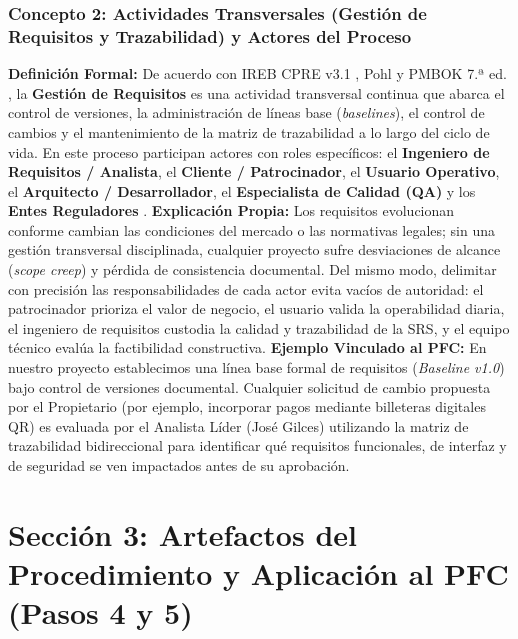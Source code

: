 \documentclass[conference,10pt]{IEEEtran}
\begin{document}
	\subsubsection{Concepto 2: Actividades Transversales (Gestión de Requisitos y Trazabilidad) y Actores del Proceso}
	\textbf{Definición Formal:} De acuerdo con IREB CPRE v3.1 \cite{ireb2023}, Pohl \cite{pohl2025} y PMBOK 7.ª ed. \cite{pmbok}, la \textbf{Gestión de Requisitos} es una actividad transversal continua que abarca el control de versiones, la administración de líneas base (\textit{baselines}), el control de cambios y el mantenimiento de la matriz de trazabilidad a lo largo del ciclo de vida. En este proceso participan actores con roles específicos: el \textbf{Ingeniero de Requisitos / Analista}, el \textbf{Cliente / Patrocinador}, el \textbf{Usuario Operativo}, el \textbf{Arquitecto / Desarrollador}, el \textbf{Especialista de Calidad (QA)} y los \textbf{Entes Reguladores} \cite{ieee29148, wiegers2013}.
	\textbf{Explicación Propia:} Los requisitos evolucionan conforme cambian las condiciones del mercado o las normativas legales; sin una gestión transversal disciplinada, cualquier proyecto sufre desviaciones de alcance (\textit{scope creep}) y pérdida de consistencia documental. Del mismo modo, delimitar con precisión las responsabilidades de cada actor evita vacíos de autoridad: el patrocinador prioriza el valor de negocio, el usuario valida la operabilidad diaria, el ingeniero de requisitos custodia la calidad y trazabilidad de la SRS, y el equipo técnico evalúa la factibilidad constructiva.
	\textbf{Ejemplo Vinculado al PFC:} En nuestro proyecto establecimos una línea base formal de requisitos (\textit{Baseline v1.0}) bajo control de versiones documental. Cualquier solicitud de cambio propuesta por el Propietario (por ejemplo, incorporar pagos mediante billeteras digitales QR) es evaluada por el Analista Líder (José Gilces) utilizando la matriz de trazabilidad bidireccional para identificar qué requisitos funcionales, de interfaz y de seguridad se ven impactados antes de su aprobación.
	\section{Sección 3: Artefactos del Procedimiento y Aplicación al PFC (Pasos 4 y 5)}
\end{document}
